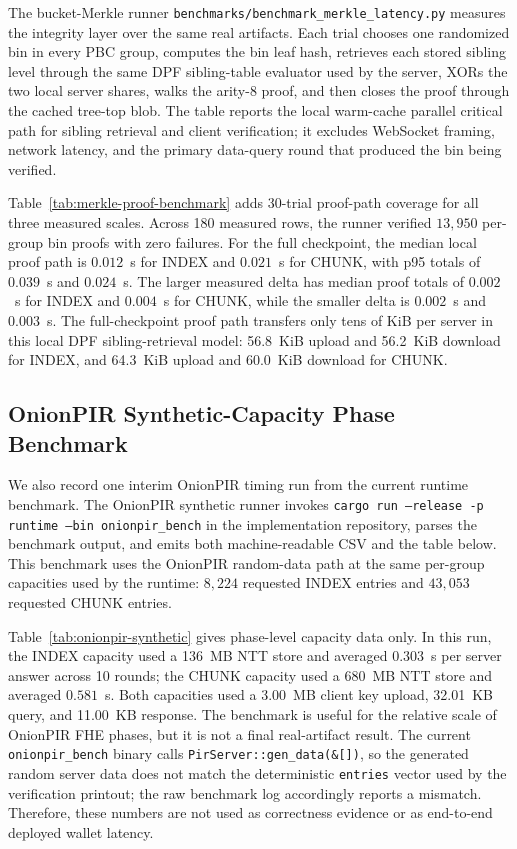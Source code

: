 The bucket-Merkle runner \texttt{benchmarks/benchmark\_merkle\_latency.py} measures the integrity layer over the same real artifacts. Each trial chooses one randomized bin in every PBC group, computes the bin leaf hash, retrieves each stored sibling level through the same DPF sibling-table evaluator used by the server, XORs the two local server shares, walks the arity-8 proof, and then closes the proof through the cached tree-top blob. The table reports the local warm-cache parallel critical path for sibling retrieval and client verification; it excludes WebSocket framing, network latency, and the primary data-query round that produced the bin being verified.



Table~\ref{tab:merkle-proof-benchmark} adds 30-trial proof-path coverage for all three measured scales. Across 180 measured rows, the runner verified $13{,}950$ per-group bin proofs with zero failures. For the full checkpoint, the median local proof path is $0.012$~s for INDEX and $0.021$~s for CHUNK, with p95 totals of $0.039$~s and $0.024$~s. The larger measured delta has median proof totals of $0.002$~s for INDEX and $0.004$~s for CHUNK, while the smaller delta is $0.002$~s and $0.003$~s. The full-checkpoint proof path transfers only tens of KiB per server in this local DPF sibling-retrieval model: 56.8~KiB upload and 56.2~KiB download for INDEX, and 64.3~KiB upload and 60.0~KiB download for CHUNK.

\subsection{OnionPIR Synthetic-Capacity Phase Benchmark}

We also record one interim OnionPIR timing run from the current runtime benchmark. The OnionPIR synthetic runner invokes \texttt{cargo run --release -p runtime --bin onionpir\_bench} in the implementation repository, parses the benchmark output, and emits both machine-readable CSV and the table below. This benchmark uses the OnionPIR random-data path at the same per-group capacities used by the runtime: $8{,}224$ requested INDEX entries and $43{,}053$ requested CHUNK entries.



Table~\ref{tab:onionpir-synthetic} gives phase-level capacity data only. In this run, the INDEX capacity used a 136~MB NTT store and averaged $0.303$~s per server answer across 10 rounds; the CHUNK capacity used a 680~MB NTT store and averaged $0.581$~s. Both capacities used a 3.00~MB client key upload, 32.01~KB query, and 11.00~KB response. The benchmark is useful for the relative scale of OnionPIR FHE phases, but it is not a final real-artifact result. The current \texttt{onionpir\_bench} binary calls \texttt{PirServer::gen\_data(\&[])}, so the generated random server data does not match the deterministic \texttt{entries} vector used by the verification printout; the raw benchmark log accordingly reports a mismatch. Therefore, these numbers are not used as correctness evidence or as end-to-end deployed wallet latency.

